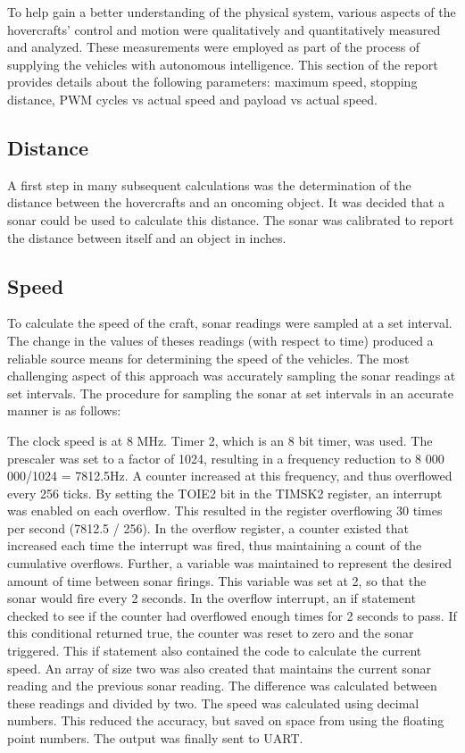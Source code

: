To help gain a better understanding of the physical system, various aspects of the hovercrafts' control and motion were qualitatively and quantitatively measured and analyzed. These measurements were employed as part of the process of supplying the vehicles with autonomous intelligence. This section of the report provides details about the following parameters: maximum speed, stopping distance, PWM cycles vs actual speed and payload vs actual speed.

\subsection{Distance}
A first step in many subsequent calculations was the determination of the distance between the hovercrafts and an oncoming object. It was decided that a sonar could be used to calculate this distance. The sonar was calibrated to report the distance between itself and an object in inches.

\subsection{Speed}
To calculate the speed of the craft, sonar readings were sampled at a set interval.  The change in the values of theses readings (with respect to time) produced a reliable source means for determining the speed of the vehicles.  The most challenging aspect of this approach was accurately sampling the sonar readings at set intervals.  The procedure for sampling the sonar at set intervals in an accurate manner is as follows:

The clock speed is at 8 MHz.  Timer 2, which is an 8 bit timer, was used. The prescaler was set to a factor of 1024, resulting in a frequency reduction to 8 000 000/1024 = 7812.5Hz. A counter increased at this frequency, and thus  overflowed every 256 ticks. By setting the TOIE2 bit in the TIMSK2 register, an interrupt was enabled on each overflow. This resulted in the register overflowing 30 times per second (7812.5 / 256). In the overflow register, a counter existed that increased each time the interrupt was fired, thus maintaining a count of the cumulative overflows.  Further, a variable was maintained to represent the desired amount of time between sonar firings. This variable was set at 2, so that the sonar would fire every 2 seconds. In the overflow interrupt, an if statement checked to see if the counter had overflowed enough times for 2 seconds to pass. If this conditional returned true, the counter was reset to zero and the sonar triggered. This if statement also contained the code to calculate the current speed. An array of size two was also created that maintains the current sonar reading and the previous sonar reading. The difference was calculated between these readings and divided by two. The speed was calculated using decimal numbers. This reduced the accuracy, but saved on space from using the floating point numbers. The output was finally sent to UART.

